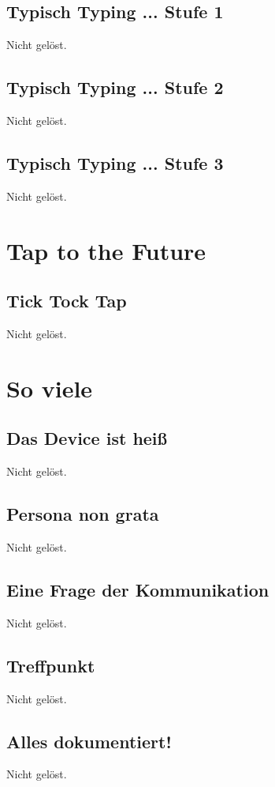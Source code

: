 \documentclass[12pt,a4paper,titlepage,oneside]{scrartcl}
\begin{document}
\subsection{Typisch Typing ... Stufe 1}
Nicht gelöst.

\subsection{Typisch Typing ... Stufe 2}
Nicht gelöst.

\subsection{Typisch Typing ... Stufe 3}
Nicht gelöst.


\section{Tap to the Future}

\subsection{Tick Tock Tap}
Nicht gelöst.


\section{So viele}

\subsection{Das Device ist heiß}
Nicht gelöst.

\subsection{Persona non grata}
Nicht gelöst.

\subsection{Eine Frage der Kommunikation}
Nicht gelöst.

\subsection{Treffpunkt}
Nicht gelöst.

\subsection{Alles dokumentiert!}
Nicht gelöst.
\end{document}
